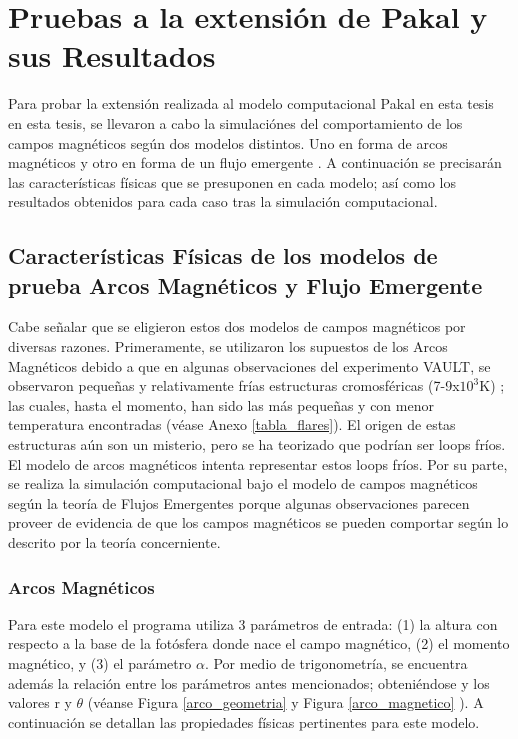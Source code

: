 \chapter{Pruebas a la extensi\'on de Pakal y sus Resultados}

Para probar la extensi\'on realizada al modelo computacional Pakal en esta tesis en esta tesis, se llevaron a cabo la simulaci\'ones del comportamiento de los campos magn\'eticos seg\'un dos modelos distintos. Uno en forma de arcos magn\'eticos \citep{ashwanden} y otro en forma de un flujo emergente \citep{flujoemergente}. A continuaci\'on se precisar\'an las caracter\'isticas f\'isicas que se presuponen en cada modelo; as\'i como los resultados obtenidos para cada caso tras la simulaci\'on computacional.

\section{Caracter\'isticas F\'isicas de los modelos de prueba \- Arcos Magn\'eticos y Flujo Emergente}

Cabe se\~nalar que se eligieron estos dos modelos de campos magn\'eticos por diversas razones. Primeramente, se utilizaron los supuestos de los Arcos Magn\'eticos debido a que en algunas observaciones del experimento VAULT, se observaron peque\~nas y relativamente fr\'ias estructuras cromosf\'ericas (7-9x$10^3$K) \citep{VAULT1}; las cuales, hasta el momento, han sido las m\'as peque\~nas y con menor temperatura encontradas (v\'ease Anexo \ref{tabla_flares}). El origen de estas estructuras a\'un son un misterio, pero se ha teorizado que podr\'ian ser loops fr\'ios\citep{VAULT1}. El modelo de arcos magn\'eticos intenta representar estos loops fr\'ios. Por su parte, se realiza la simulaci\'on computacional bajo el modelo de campos magn\'eticos seg\'un la teor\'ia de Flujos Emergentes \citep{flujoemergente} porque algunas observaciones \citep{flux_reference} parecen proveer de evidencia de que los campos magn\'eticos se pueden comportar seg\'un lo descrito por la teor\'ia concerniente. 

\subsection{Arcos Magn\'eticos}

Para este modelo el programa utiliza 3 par\'ametros de entrada: (1) la altura con respecto a la base de la fot\'osfera donde nace el campo magn\'etico, (2) el momento magn\'etico, y (3) el par\'ametro $\alpha$. Por medio de trigonometr\'ia, se encuentra adem\'as la relaci\'on entre los par\'ametros antes mencionados; obteni\'endose y los valores r y $\theta$ (v\'eanse Figura \ref{arco_geometria} y Figura \ref{arco_magnetico} ). A continuaci\'on se detallan las propiedades f\'isicas pertinentes para este modelo.

